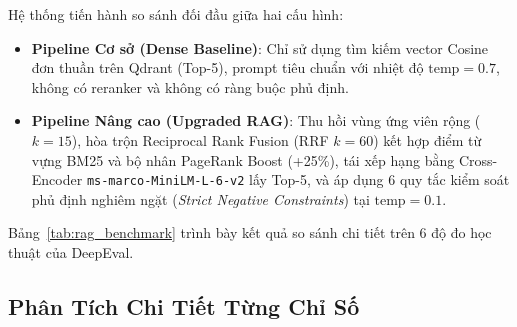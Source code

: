 Hệ thống tiến hành so sánh đối đầu giữa hai cấu hình:
\begin{itemize}
  \item \textbf{Pipeline Cơ sở (Dense Baseline)}: Chỉ sử dụng tìm kiếm vector Cosine đơn thuần trên Qdrant (Top-5), prompt tiêu chuẩn với nhiệt độ $\text{temp} = 0.7$, không có reranker và không có ràng buộc phủ định.
  \item \textbf{Pipeline Nâng cao (Upgraded RAG)}: Thu hồi vùng ứng viên rộng ($k=15$), hòa trộn Reciprocal Rank Fusion (RRF $k=60$) kết hợp điểm từ vựng BM25 và bộ nhân PageRank Boost (+25\%), tái xếp hạng bằng Cross-Encoder \texttt{ms-marco-MiniLM-L-6-v2} lấy Top-5, và áp dụng 6 quy tắc kiểm soát phủ định nghiêm ngặt (\textit{Strict Negative Constraints}) tại $\text{temp} = 0.1$.
\end{itemize}

Bảng~\ref{tab:rag_benchmark} trình bày kết quả so sánh chi tiết trên 6 độ đo học thuật của DeepEval.



\subsection{Phân Tích Chi Tiết Từng Chỉ Số}

